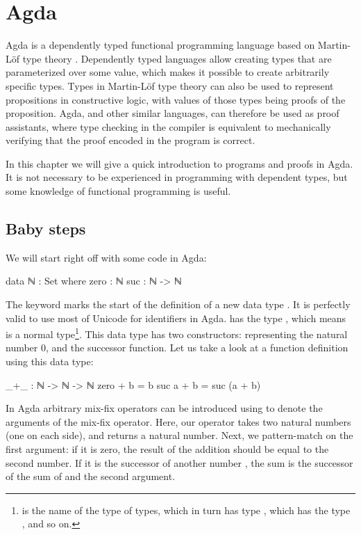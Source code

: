 
\chapter{Agda} \label{Agda}

	Agda is a dependently typed functional programming language based on
	Martin-Löf type theory \cite{?}. Dependently typed languages allow creating
	types that are parameterized over some value, which makes it possible to
	create arbitrarily specific types. Types in Martin-Löf type theory can also
	be used to represent propositions in constructive logic, with values of
	those types being proofs of the proposition. Agda, and other similar
	languages, can therefore be used as proof assistants, where type checking
	in the compiler is equivalent to mechanically verifying that the proof
	encoded in the program is correct.

	In this chapter we will give a quick introduction to programs and proofs in
	Agda. It is not necessary to be experienced in programming with dependent
	types, but some knowledge of functional programming is useful.

	\section{Baby steps}

		We will start right off with some code in Agda:

		\begin{code}
			data ℕ : Set where
			  zero : ℕ
			  suc : ℕ -> ℕ
		\end{code}

		The keyword  marks the start of the definition of a new
		data type . It is perfectly valid to use most of Unicode for
		identifiers in Agda.  has the type , which means
		 is a normal type\footnote{ is the name of the
		type of types, which in turn has type , which has the type
		, and so on.}. This data type has two constructors:
		 representing the natural number $0$, and
		 the successor function.  Let us take a look at a function
		definition using this data type:

		\begin{code}
			_+_ : ℕ -> ℕ -> ℕ
			zero + b = b
			suc a + b = suc (a + b)
		\end{code}

		In Agda arbitrary mix-fix operators can be introduced using \codett{\_}
		to denote the arguments of the mix-fix operator. Here, our operator
		\codett{\_+\_} takes two natural numbers (one on each side), and
		returns a natural number. Next, we pattern-match on the first argument:
		if it is zero, the result of the addition should be equal to the second
		number. If it is the successor of another number , the sum is
		the successor of the sum of  and the second argument.

